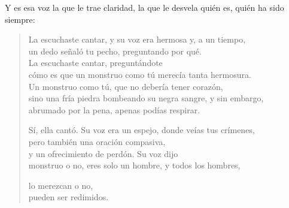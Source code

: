 Y es esa voz la que le trae claridad, la que le desvela quién es, quién ha sido siempre:

\begin{verse}
La escuchaste cantar, y su voz era hermosa y, a un tiempo,\\
un dedo señaló tu pecho, preguntando por qué.\\
La escuchaste cantar, preguntándote\\
cómo es que un monstruo como tú merecía tanta hermosura.\\
Un monstruo como tú, que no debería tener corazón,\\
sino una fría piedra bombeando su negra sangre, y sin embargo,\\
abrumado por la pena, apenas podías respirar.

Sí, ella cantó. Su voz era un espejo, donde veías tus crímenes,\\
pero también una oración compasiva,\\
y un ofrecimiento de perdón. Su voz dijo\\
monstruo o no, eres solo un hombre, y todos los hombres,

lo merezcan o no,\\
pueden ser redimidos.
\end{verse}
